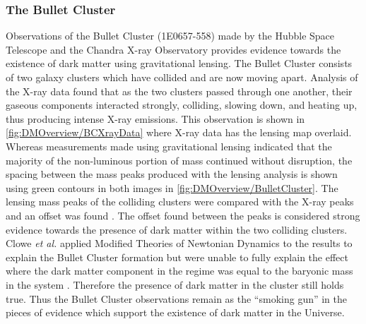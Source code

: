 \subsubsection{The Bullet Cluster}\label{sec:DMOverview/BulletCluster}
Observations of the Bullet Cluster (1E0657-558) made by the Hubble Space Telescope and the Chandra X-ray Observatory provides evidence towards the existence of dark matter using gravitational lensing.
The Bullet Cluster consists of two galaxy clusters which have collided and are now moving apart. 
Analysis of the X-ray data found that as the two clusters passed through one another, their gaseous components interacted strongly, colliding, slowing down, and heating up, thus producing intense X-ray emissions. This observation is shown in \autoref{fig:DMOverview/BCXrayData} where X-ray data has the lensing map overlaid.  Whereas measurements made using gravitational lensing indicated that the majority of the non-luminous portion of mass continued without disruption, the spacing between the mass peaks produced with the lensing analysis is shown using green contours in both images in \autoref{fig:DMOverview/BulletCluster}. The lensing mass peaks of the colliding clusters were compared with the X-ray peaks and an offset was found \cite{Clowe_2004}. The offset found between the peaks is considered strong evidence towards the presence of dark matter within the two colliding clusters. Clowe \textit{et al.} applied Modified Theories of Newtonian Dynamics to the results to explain the Bullet Cluster formation but were unable to fully explain the effect where the dark matter component in the regime was equal to the baryonic mass in the system \cite{Clowe2006}. Therefore the presence of dark matter in the cluster still holds true. Thus the Bullet Cluster observations remain as the ``smoking gun'' in the pieces of evidence which support the existence of dark matter in the Universe.
